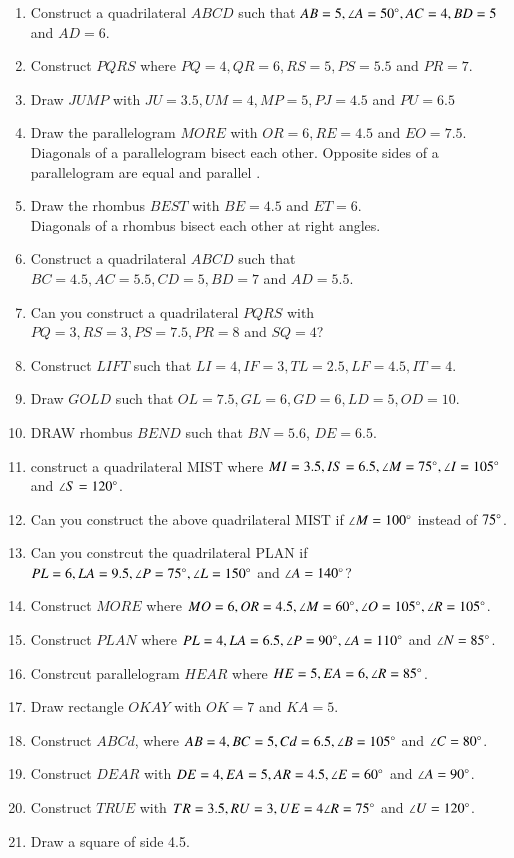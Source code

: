 \documentclass[journal,12pt,twocolumn]{IEEEtran}
\renewcommand\thesection{\arabic{section}}
\begin{document}
\begin{enumerate}[label=\thesection.\arabic*
,ref=\thesection.\theenumi]
\item Construct a quadrilateral $ABCD$ such that $AB=5, \angle A = 50\degree, AC = 4, BD = 5$ and $AD = 6$.
\item Construct $PQRS$ where $PQ = 4, QR = 6, RS = 5, PS = 5.5$ and $PR = 7$.
\item Draw $JUMP$ with $JU = 3.5, UM=4, MP = 5, PJ =4.5$ and $PU = 6.5$
\item Draw the parallelogram $MORE$ with $OR = 6, RE = 4.5$ and $EO=7.5$.
\\
\solution
Diagonals of a parallelogram bisect each other.  Opposite sides of a parallelogram are equal and parallel
.
\item Draw the rhombus $BEST$ with $BE = 4.5$ and $ET = 6$. 
\\
\solution Diagonals of a rhombus bisect each other at right angles.
\item Construct a quadrilateral $ABCD$ such that $BC=4.5,  AC = 5.5, CD = 5, BD = 7$ and $AD = 5.5$.
\item Can you construct a quadrilateral $PQRS$ with $PQ=3, RS=3, PS=7.5, PR=8$ and $SQ=4$?
\item Construct $LIFT$ such that $LI = 4, IF = 3, TL = 2.5, LF = 4.5, IT=4$.
\item Draw $GOLD$ such that $OL=7.5, GL=6, GD=6, LD = 5, OD = 10$.
\item DRAW rhombus $BEND$ such that $BN = 5.6$, $DE = 6.5$.
\item construct a quadrilateral MIST where $MI = 3.5, IS = 6.5, \angle M = 75 \degree, \angle I = 105 \degree$ and $\angle S = 120 \degree$.
\item Can you construct the above quadrilateral MIST if $\angle M = 100 \degree$ instead of $75 \degree$.
\item Can you constrcut the quadrilateral PLAN if $PL = 6, LA = 9.5, \angle P = 75 \degree, \angle L = 150 \degree$ and $\angle A = 140 \degree$?
\item Construct $MORE$ where $MO = 6, OR = 4.5, \angle M = 60 \degree, \angle O = 105 \degree, \angle R = 105 \degree$.
\item Construct $PLAN$ where $PL = 4, LA = 6.5, \angle P = 90 \degree, \angle A = 110\degree$ and $\angle N = 85\degree$.
\item Constrcut parallelogram $HEAR$ where $HE = 5, EA = 6, \angle R = 85 \degree$.
\item Draw  rectangle $OKAY$ with $OK = 7$ and $KA = 5$.
\item Construct $ABCd $, where $AB = 4, BC = 5, Cd = 6.5, \angle B = 105 \degree$ and $\angle C = 80\degree$.
\item Construct $DEAR$ with $DE = 4, EA = 5, AR = 4.5, \angle E = 60 \degree$ and $\angle A = 90 \degree$.\item Construct $TRUE$ with $TR = 3.5, RU = 3, UE = 4 \angle R = 75\degree$ and $\angle U = 120\degree$.
\item Draw a square of side 4.5.


\end{enumerate}
\end{document}
